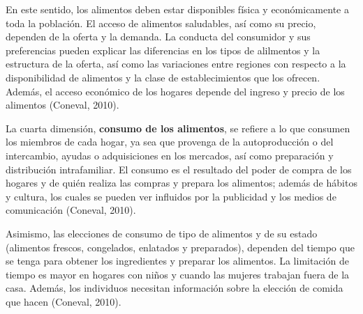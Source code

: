 En este sentido, los alimentos deben estar disponibles física y económicamente a toda la población. El acceso de alimentos saludables, así como su precio, dependen de la oferta y la demanda. La conducta del consumidor y sus preferencias pueden explicar las diferencias en los tipos de alilmentos y la estructura de la oferta, así como las variaciones entre regiones con respecto a la disponibilidad de alimentos y la clase de establecimientos que los ofrecen. Además, el acceso económico de los hogares depende del ingreso y precio de los alimentos (Coneval, 2010).

La cuarta dimensión, \textbf{consumo de los alimentos}, se refiere a lo que consumen los miembros de cada hogar, ya sea que provenga de la autoproducción o del intercambio, ayudas o adquisiciones en los mercados, así como preparación y distribución intrafamiliar. El consumo es el resultado del poder de compra de los hogares y de quién realiza las compras y prepara los alimentos; además de hábitos y cultura, los cuales se pueden ver influidos por la publicidad y los medios de comunicación (Coneval, 2010). 

Asimismo, las elecciones de consumo de tipo de alimentos y de su estado (alimentos frescos, congelados, enlatados y preparados), dependen del tiempo que se tenga para obtener los ingredientes y preparar los alimentos. La limitación de tiempo es mayor en hogares con niños y cuando las mujeres trabajan fuera de la casa. Además, los individuos necesitan información sobre la elección de comida que hacen (Coneval, 2010).

